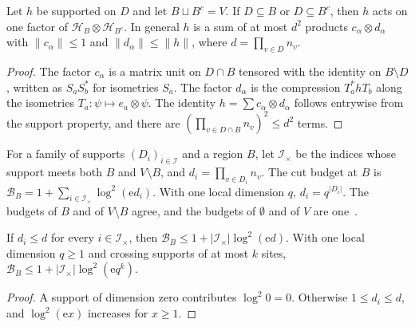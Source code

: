 \begin{lemma}
    \label{lem:supported_product_decomposition}
    \leanok
    Let $h$ be supported on $D$ and let $B\sqcup B^c=V$. If $D\subseteq B$ or
    $D\subseteq B^c$, then $h$ acts on one factor of
    $\mathcal H_B\otimes\mathcal H_{B^c}$. In general $h$ is a sum of at most
    $d^2$ products $c_\alpha\otimes d_\alpha$ with $\lVert c_\alpha\rVert\le1$
    and $\lVert d_\alpha\rVert\le\lVert h\rVert$, where
    $d=\prod_{v\in D}n_v$.
\end{lemma}
\begin{proof}\leanok
    The factor $c_\alpha$ is a matrix unit on $D\cap B$ tensored with the
    identity on $B\setminus D$, written as $S_aS_b^*$ for isometries
    $S_a$. The factor $d_\alpha$ is the compression $T_a^*hT_b$ along the
    isometries $T_a\colon\psi\mapsto e_a\otimes\psi$. The identity
    $h=\sum c_\alpha\otimes d_\alpha$ follows entrywise from the support
    property, and there are $(\prod_{v\in D\cap B}n_v)^2\le d^2$ terms.
\end{proof}

\begin{definition}
    \label{def:marginal_tails_cut_budget}
    \leanok
    For a family of supports $(D_i)_{i\in\mathcal I}$ and a region $B$, let
    $\mathcal I_\times$ be the indices whose support meets both $B$ and $V\setminus B$,
    and $d_i=\prod_{v\in D_i}n_v$. The cut budget at $B$ is
    $\mathcal B_B=1+\sum_{i\in\mathcal I_\times}\log^2(\mathrm ed_i)$. With one local
    dimension $q$, $d_i=q^{|D_i|}$. The budgets of $B$ and of $V\setminus B$ agree, and the
    budgets of $\emptyset$ and of $V$ are one~\cite{OpenAI2026AreaLaw}.
\end{definition}

\begin{lemma}
    \label{lem:marginal_tails_cut_budget}
    \leanok
    If $d_i\le d$ for every $i\in\mathcal I_\times$, then
    $\mathcal B_B\le1+|\mathcal I_\times|\log^2(\mathrm ed)$. With one local dimension
    $q\ge1$ and crossing supports of at most $k$ sites,
    $\mathcal B_B\le1+|\mathcal I_\times|\log^2(\mathrm eq^k)$.
\end{lemma}
\begin{proof}\leanok
    A support of dimension zero contributes $\log^2 0=0$. Otherwise
    $1\le d_i\le d$, and $\log^2(\mathrm e x)$ increases for $x\ge1$.
\end{proof}

